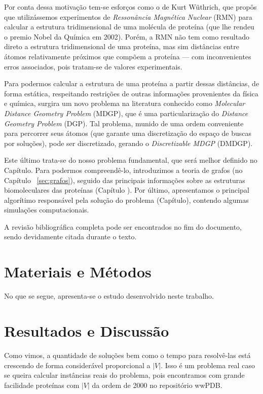 \documentclass[a4paper,12pt]{article}
\begin{document}
	Por conta dessa motivação tem-se esforços como o de Kurt Wüthrich, que propôs que utilizássemos experimentos de \textit{Ressonância Magnética Nuclear}
	(RMN) para calcular a estrutura tridimensional de uma molécula de proteína (que lhe rendeu o premio Nobel da Química em 2002). Porém, a RMN não tem como resultado direto a estrutura tridimensional de uma proteína, mas sim distâncias entre átomos relativamente próximos que compõem a proteína --- com inconvenientes erros associados, pois tratam-se de valores experimentais.
	
	Para podermos calcular a estrutura de uma proteína a partir dessas distâncias, de forma estática, respeitando restrições de outras informações provenientes da física e química, surgira um novo problema na literatura conhecido como \textit{Molecular Distance Geometry Problem} (MDGP), que é uma particularização do \textit{Distance Geometry Problem} (DGP). Tal problema, munido de uma ordem conveniente para percorrer seus átomos (que garante uma discretização do espaço de buscas por soluções), pode ser discretizado, gerando o \textit{Discretizable MDGP} (DMDGP).
	
	Este último trata-se do nosso problema fundamental, que será melhor definido no Capítulo. Para podermos compreendê-lo, introduzimos a teoria de grafos (no Capítulo ~\ref{sec:grafos}), seguido das principais informações sobre as estruturas biomoleculares das proteínas (Capítulo ). Por último, apresentamos o principal algorítimo responsável pela solução do problema (Capítulo), contendo algumas simulações computacionais.
	
	A revisão bibliográfica completa pode ser encontrados no fim do documento, sendo devidamente citada durante o texto. 
	
	\newpage
	
	\section*{Materiais e Métodos}
	No que se segue, apresenta-se o estudo desenvolvido neste trabalho.
	
	
	
	\newpage
	
	

		\newpage
	\section{Resultados e Discussão \label{sec:disc}}
	Como vimos, a quantidade de soluções bem como o tempo para resolvê-las está crescendo de forma considerável proporcional a $|V|$. Isso é um problema real caso se queira calcular instâncias reais do problema, pois encontramos com grande facilidade proteínas com $|V|$ da ordem de 2000 no repositório wwPDB.
	
\end{document}
